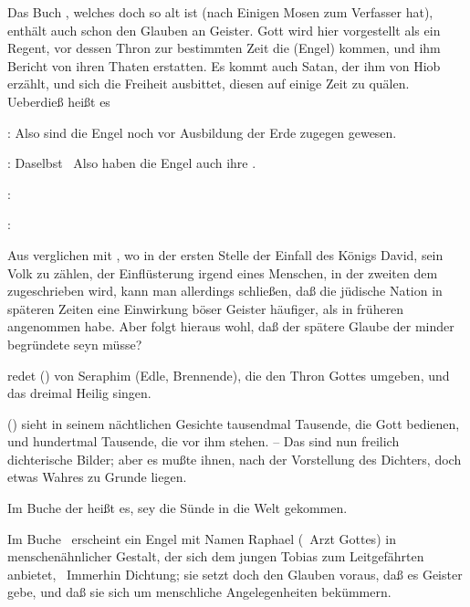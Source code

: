\begin{aufza}
\item Das Buch , welches doch so alt ist (nach Einigen Mosen zum Verfasser hat), enthält auch schon den Glauben an Geister. Gott wird hier vorgestellt als ein Regent, vor dessen Thron zur bestimmten Zeit die  (Engel) kommen, und ihm Bericht von ihren Thaten erstatten. Es kommt auch Satan, der ihm von Hiob erzählt, und sich die Freiheit ausbittet, diesen auf einige Zeit zu quälen. Ueberdieß heißt es\par
{}:  Also sind die Engel noch vor Ausbildung der Erde zugegen gewesen.\par
{}:  Daselbst \ Also haben die Engel auch ihre .
\item {}: \par
{}: 
\end{aufza}

Aus  verglichen mit , wo in der ersten Stelle der Einfall des Königs David, sein Volk zu zählen, der Einflüsterung irgend eines Menschen, in der zweiten dem  zugeschrieben wird, kann man allerdings schließen, daß die jüdische Nation in späteren Zeiten eine Einwirkung böser Geister häufiger, als in früheren angenommen habe. Aber folgt hieraus wohl, daß der spätere Glaube der minder begründete seyn müsse?
\begin{aufza}
\item {} redet () von Seraphim (Edle, Brennende), die den Thron Gottes umgeben, und das dreimal Heilig singen.
\item {} () sieht in seinem nächtlichen Gesichte tausendmal Tausende, die Gott bedienen, und hundertmal Tausende, die vor ihm stehen. -- Das sind nun freilich dichterische Bilder; aber es mußte ihnen, nach der Vorstellung des Dichters, doch etwas Wahres zu Grunde liegen.
\item Im Buche der  heißt es,  sey die Sünde in die Welt gekommen.
\item Im Buche \ erscheint ein Engel mit Namen Raphael (\dh\ Arzt Gottes) in menschenähnlicher Gestalt, der sich dem jungen Tobias zum Leitgefährten anbietet, \usw\ Immerhin Dichtung; sie setzt doch den Glauben voraus, daß es Geister gebe, und daß sie sich um menschliche Angelegenheiten bekümmern.
\end{aufza}

